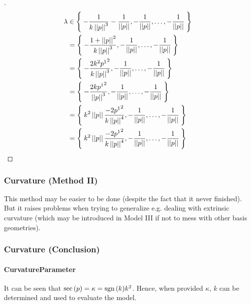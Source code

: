 \documentclass[../main.tex]{subfiles}
\begin{document}
\begin{proof}[]
\begin{align*}
        \lambda &\in \Set{-\frac{1}{k\norm{p}^3} - \frac{1}{\norm{p}},-\frac{1}{\norm{p}},\dots,-\frac{1}{\norm{p}}} \\
        &= \Set{-\frac{1+\norm{p}^2}{k\norm{p}^3},-\frac{1}{\norm{p}},\dots,-\frac{1}{\norm{p}}} \\
        &= \Set{-\frac{2k^2{\tensor{p}{^1}}^2}{k\norm{p}^3},-\frac{1}{\norm{p}},\dots,-\frac{1}{\norm{p}}} \\
        &= \Set{-\frac{2k{\tensor{p}{^1}}^2}{\norm{p}^3},-\frac{1}{\norm{p}},\dots,-\frac{1}{\norm{p}}} \\
        &= \Set{k^2\norm{p}\frac{-2{\tensor{p}{^1}}^2}{k\norm{p}^4},-\frac{1}{\norm{p}},\dots,-\frac{1}{\norm{p}}} \\
        &= \Set{k^2\norm{p}\frac{-2{\tensor{p}{^1}}^2}{k\norm{p}^4},-\frac{1}{\norm{p}},\dots,-\frac{1}{\norm{p}}} \\
    \end{align*}
\end{proof}
\subsubsection{Curvature (Method II)}
This method may be easier to be done
(despite the fact that it never finished).
But it raises problems when trying to generalize e.g. dealing with extrinsic curvature
(which may be introduced in Model III
if not to mess with other basis geometries).
\begin{lemma}\label{Model:ChristoffelSymbol}

\end{lemma}
\begin{lemma}\label{Model:RiemannCurvatureTensor}

\end{lemma}
\subsubsection{Curvature (Conclusion)}
\begin{lemma}\label{Model:SectionalCurvature}

\end{lemma}
\paragraph{CurvatureParameter}
It can be seen that $\operatorname{sec}\left(p\right) = \kappa = \operatorname{sgn}{\left(k\right)}k^2$.
Hence, when provided $\kappa$, $k$ can be determined and used to evaluate the model.
\end{document}
